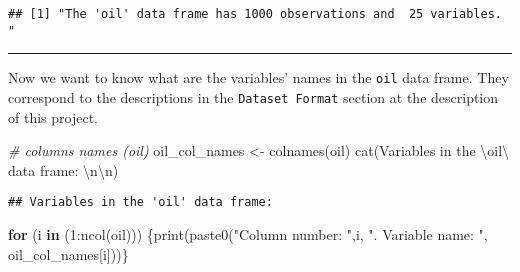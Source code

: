 \documentclass[
]{article}
\newenvironment{Shaded}{\begin{snugshade}}{\end{snugshade}}
\newcommand{\CommentTok}[1]{\textcolor[rgb]{0.56,0.35,0.01}{\textit{#1}}}
\newcommand{\ControlFlowTok}[1]{\textcolor[rgb]{0.13,0.29,0.53}{\textbf{#1}}}
\newcommand{\DecValTok}[1]{\textcolor[rgb]{0.00,0.00,0.81}{#1}}
\newcommand{\FunctionTok}[1]{\textcolor[rgb]{0.00,0.00,0.00}{#1}}
\newcommand{\NormalTok}[1]{#1}
\newcommand{\OtherTok}[1]{\textcolor[rgb]{0.56,0.35,0.01}{#1}}
\newcommand{\SpecialCharTok}[1]{\textcolor[rgb]{0.00,0.00,0.00}{#1}}
\newcommand{\StringTok}[1]{\textcolor[rgb]{0.31,0.60,0.02}{#1}}
\begin{document}
\begin{verbatim}
## [1] "The 'oil' data frame has 1000 observations and  25 variables. "
\end{verbatim}

\begin{center}\rule{0.5\linewidth}{0.5pt}\end{center}

Now we want to know what are the variables' names in the \texttt{oil}
data frame. They correspond to the descriptions in the
\texttt{Dataset\ Format} section at the description of this project.

\begin{Shaded}
\begin{Highlighting}[]
\CommentTok{\# columns names (oil)}
\NormalTok{oil\_col\_names }\OtherTok{\textless{}{-}} \FunctionTok{colnames}\NormalTok{(oil)}
\FunctionTok{cat}\NormalTok{(}\StringTok{\textquotesingle{}Variables in the }\SpecialCharTok{\textbackslash{}\textquotesingle{}}\StringTok{oil}\SpecialCharTok{\textbackslash{}\textquotesingle{}}\StringTok{ data frame: }\SpecialCharTok{\textbackslash{}n\textbackslash{}n}\StringTok{\textquotesingle{}}\NormalTok{)}
\end{Highlighting}
\end{Shaded}

\begin{verbatim}
## Variables in the 'oil' data frame:
\end{verbatim}

\begin{Shaded}
\begin{Highlighting}[]
\ControlFlowTok{for}\NormalTok{ (i }\ControlFlowTok{in}\NormalTok{ (}\DecValTok{1}\SpecialCharTok{:}\FunctionTok{ncol}\NormalTok{(oil))) \{}\FunctionTok{print}\NormalTok{(}\FunctionTok{paste0}\NormalTok{(}\StringTok{"Column number: "}\NormalTok{,i, }\StringTok{". Variable name: "}\NormalTok{, oil\_col\_names[i]))\}}
\end{Highlighting}
\end{Shaded}
\end{document}
